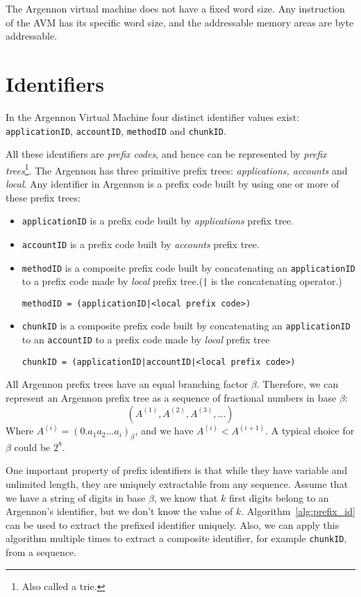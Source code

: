 The Argennon virtual machine does not have a fixed word size. Any instruction of the AVM has
its specific word size, and the addressable memory areas are byte addressable.


\section{Identifiers}\label{sec:identifiers}

In the Argennon Virtual Machine four distinct identifier values exist: \texttt{applicationID}, \texttt{accountID},
\texttt{methodID} and \texttt{chunkID}.

All these identifiers are \emph{prefix codes}, and hence can be represented by
\emph{prefix trees}\footnote{Also called a trie.}. The Argennon has three primitive prefix trees:
\emph{applications, accounts} and \emph{local}. Any identifier in Argennon is a
prefix code built by using one or more of these prefix trees:
\begin{itemize}
    \item \texttt{applicationID} is a prefix code built by \emph{applications} prefix tree.
    \item \texttt{accountID} is a prefix code built by \emph{accounts} prefix tree.
    \item \texttt{methodID} is a composite prefix code built by concatenating an \texttt{applicationID} to
    a prefix code made by \emph{local} prefix tree.(\texttt{|} is the concatenating operator.)

    \texttt{methodID = (applicationID|<local prefix code>)}
    \item \texttt{chunkID} is a composite prefix code built by concatenating an \texttt{applicationID} to
    an \texttt{accountID} to a prefix code made by \emph{local} prefix tree

    \texttt{chunkID = (applicationID|accountID|<local prefix code>)}
\end{itemize}

All Argennon prefix trees have an equal branching factor \(\beta\). Therefore, we can represent an Argennon
prefix tree as a sequence of fractional numbers in base \(\beta\):
\[
    (A^{(1)},A^{(2)},A^{(3)},\dots)
\]
Where \(A^{(i)}=(0.a_{1}a_{2}\dots a_{i})_\beta\), and we have \(A^{(i)}<A^{(i+1)}\). A typical choice for \(\beta\)
could be \(2^8\).

One important property of prefix identifiers is that while they have variable and unlimited length, they are
uniquely extractable from any sequence. Assume that we have a string of digits in base $\beta$, we
know that $k$ first digits belong to an Argennon's identifier, but we don't know the value of $k$.
Algorithm~\ref{alg:prefix_id} can be used to extract the prefixed identifier uniquely. Also, we can apply this algorithm
multiple times to extract a composite identifier, for example \texttt{chunkID}, from a sequence.


